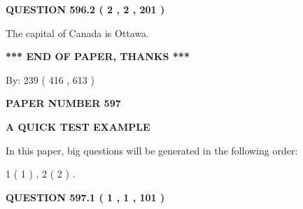 \documentclass[12pt]{article}
\begin{document}
 
  
\vspace{0.2in}
  
{\textbf{\Large{QUESTION
596.2 
 ( 2 , 2 , 201 )
}}}
  
  
 
 
\noindent{}
 
 
The capital of Canada is Ottawa.
 
 
 
 
   
   
 \vspace{0.2in}
 
   
   
   
   
\vspace{1.0in} 
{\textbf{\large{ *** END OF PAPER, THANKS *** }}} 
   
   
\hspace{1.0in} By: 
 239 ( 416 ,  613 )
   
   
   
   
\newpage 
\setcounter{page}{ 
   597001 } 
   
   
   
   
 {\textbf{ \Large{ PAPER NUMBER  597  }}}
   
   
\vspace{0.2in}
   
   
   
   
   
   
 \vspace{0.2in}
{\LARGE {\textbf{ A QUICK TEST EXAMPLE}}}
   
   
   
\vspace{0.2in}
   
In this paper, big questions will be generated in the following order: 
   
   
   1 ( 1 )
 ,
   2 ( 2 )
 .
  
\vspace{0.2in}
  
{\textbf{\Large{QUESTION
597.1 
 ( 1 , 1 , 101 )
}}}
  
  
 
 
\noindent{}
\end{document}
